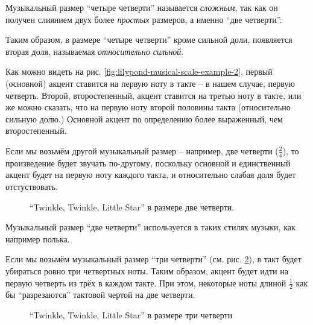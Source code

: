 \documentclass[a4paper,twoside]{book}
\newcounter{example-counter}
\begin{document}
Музыкальный размер ``четыре четверти'' называется \emph{сложным}, так как он
получен слиянием двух более \emph{простых} размеров, а именно ``две четверти''.

Таким образом, в размере ``четыре четверти'' кроме сильной доли, появляется
вторая доля, называемая \emph{относительно сильной}.

Как можно видеть на рис. \ref{fig:lilypond-musical-scale-example-2}, первый
(основной) акцент ставится на первую ноту в такте -- в нашем случае, первую
четверть.  Второй, второстепенный, акцент ставится на третью ноту в такте, или
же можно сказать, что на первую ноту второй половины такта (относительно сильную
долю.)  Основной акцент по определению более выраженный, чем второстепенный.

Если мы возьмём другой музыкальный размер -- например, две четверти
($\frac{2}{4}$), то произведение будет звучать по-другому, поскольку основной и
единственный акцент будет на первую ноту каждого такта, и относительно слабая
доля будет отстуствовать.

\begin{figure}[ht]
  \caption{``Twinkle, Twinkle, Little Star'' в размере две четверти.}
  \centering
  \label{fig:lilypond-musical-scale-example-3}
\end{figure}

Музыкальный размер ``две четверти'' используется в таких стилях музыки, как
например полька.

Если мы возьмём музыкальный размер ``три четверти''
(см. рис. \ref{fig:lilypond-musical-scale-example-4}), в такт будет убираться
ровно три четвертных ноты.  Таким образом, акцент будет идти на первую четверть
из трёх в каждом такте.  При этом, некоторые ноты длиной $\frac{1}{2}$ как бы
``разрезаются'' тактовой чертой на две четверти.

\begin{figure}[ht]
  \caption{``Twinkle, Twinkle, Little Star'' в размере три четверти}
  \centering
  \label{fig:lilypond-musical-scale-example-4}
\end{figure}
\end{document}
